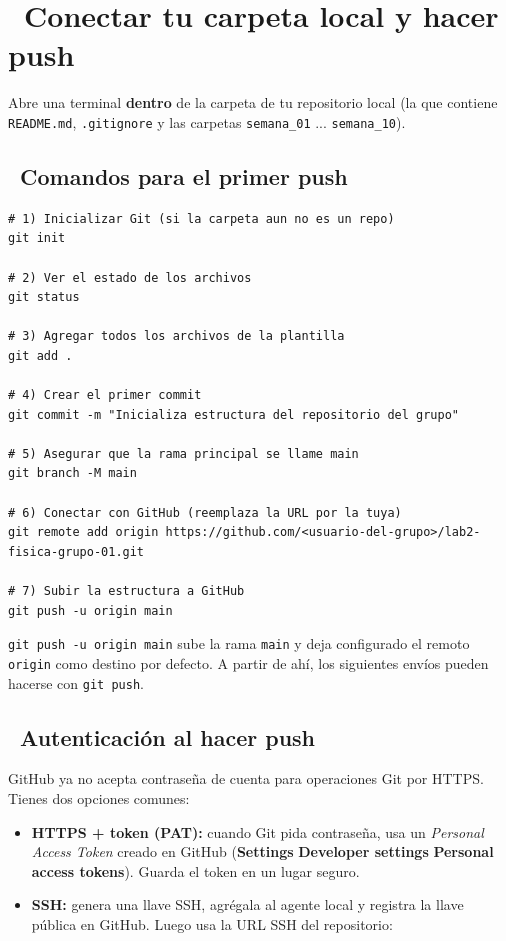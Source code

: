 \documentclass[11pt,a4paper]{article}
\newcommand{\iconotexto}[2]{\textcolor{cyanNeon}{\faIcon{#1}}~#2}
\begin{document}
\section{\iconotexto{upload}{Conectar tu carpeta local y hacer push}}

Abre una terminal \textbf{dentro} de la carpeta de tu repositorio local (la que contiene \texttt{README.md}, \texttt{.gitignore} y las carpetas \texttt{semana\_01} ... \texttt{semana\_10}).

\subsection{\iconotexto{play-circle}{Comandos para el primer push}}

\begin{lstlisting}
# 1) Inicializar Git (si la carpeta aun no es un repo)
git init

# 2) Ver el estado de los archivos
git status

# 3) Agregar todos los archivos de la plantilla
git add .

# 4) Crear el primer commit
git commit -m "Inicializa estructura del repositorio del grupo"

# 5) Asegurar que la rama principal se llame main
git branch -M main

# 6) Conectar con GitHub (reemplaza la URL por la tuya)
git remote add origin https://github.com/<usuario-del-grupo>/lab2-fisica-grupo-01.git

# 7) Subir la estructura a GitHub
git push -u origin main
\end{lstlisting}

\begin{cajaConcepto}
\texttt{git push -u origin main} sube la rama \texttt{main} y deja configurado el remoto \texttt{origin} como destino por defecto. A partir de ahí, los siguientes envíos pueden hacerse con \texttt{git push}.
\end{cajaConcepto}

\subsection{\iconotexto{key}{Autenticación al hacer push}}

GitHub ya no acepta contraseña de cuenta para operaciones Git por HTTPS. Tienes dos opciones comunes:

\begin{itemize}[leftmargin=1.4em,itemsep=4pt,topsep=2pt]
  \item \textbf{HTTPS + token (PAT):} cuando Git pida contraseña, usa un \emph{Personal Access Token} creado en GitHub (\textbf{Settings} \textrightarrow{} \textbf{Developer settings} \textrightarrow{} \textbf{Personal access tokens}). Guarda el token en un lugar seguro.
  \item \textbf{SSH:} genera una llave SSH, agrégala al agente local y registra la llave pública en GitHub. Luego usa la URL SSH del repositorio:
\end{itemize}
\end{document}
